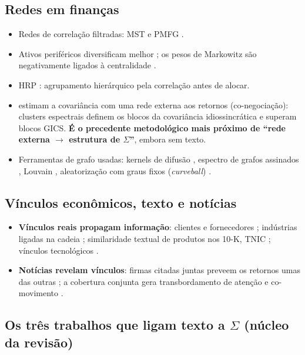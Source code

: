 \documentclass[11pt,a4paper]{article}
\begin{document}
\subsection{Redes em finanças}

\begin{itemize}
  \item Redes de correlação filtradas: MST \citep{mantegna1999} e PMFG \citep{tumminello2005}.
  \item Ativos periféricos diversificam melhor \citep{pozzi2013}; os pesos de Markowitz são
        negativamente ligados à centralidade \citep{peralta2016}.
  \item HRP \citep{lopezdeprado2016}: agrupamento hierárquico pela correlação antes de alocar.
  \item \citet{lu2023} estimam a covariância com uma rede externa aos retornos (co-negociação):
        clusters espectrais definem os blocos da covariância idiossincrática e superam blocos GICS.
        \textbf{É o precedente metodológico mais próximo de ``rede externa $\to$ estrutura de
        $\Sigma$''}, embora sem texto.
  \item Ferramentas de grafo usadas: kernels de difusão \citep{kondor2002}, espectro de grafos
        assinados \citep{kunegis2010}, Louvain \citep{blondel2008}, aleatorização com graus fixos
        (\emph{curveball}) \citep{strona2014}.
\end{itemize}

\subsection{Vínculos econômicos, texto e notícias}

\begin{itemize}
  \item \textbf{Vínculos reais propagam informação}: clientes e fornecedores \citep{cohen2008};
        indústrias ligadas na cadeia \citep{menzly2010}; similaridade textual de produtos nos 10-K,
        TNIC \citep{hoberg2016}; vínculos tecnológicos \citep{lee2019}.
  \item \textbf{Notícias revelam vínculos}: firmas citadas juntas preveem os retornos umas das outras
        \citep{scherbina2020}; a cobertura conjunta gera transbordamento de atenção e co-movimento
        \citep{guo2017}.
\end{itemize}

\subsection{Os três trabalhos que ligam texto a $\Sigma$ (núcleo da revisão)}
\end{document}
